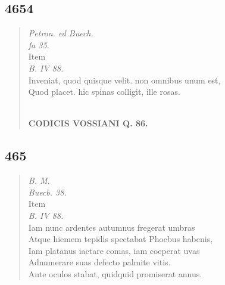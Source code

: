 \documentclass[11pt, a4paper]{report}
\begin{document}
            \subsection*{4654}
      \begin{verse}
      \textit{Petron. ed Buech.} \\ \textit{fa 35.} \\ Item \\ \textit{B. IV 88.} \\ Inveniat, quod quisque velit. non omnibus unum est, \\ Quod placet. hic spinas colligit, ille rosas. \\ 
        ﻿\pagebreak 
    \begin{center} \textbf{CODICIS VOSSIANI Q. 86.} \end{center} \marginpar{[343]} 
      \end{verse}
  
            \subsection*{465}
      \begin{verse}
      \textit{B. M.} \\ \textit{Buecb. 38.} \\ Item \\ \textit{B. IV 88.} \\ Iam nunc ardentes autumnus fregerat umbras \\ Atque hiemem tepidis spectabat Phoebus habenis, \\ Iam platanus iactare comas, iam coeperat uvas \\ Adnumerare suas defecto palmite vitis. \\ Ante oculos stabat, quidquid promiserat annus. \\ 
      \end{verse}
  
\end{document}
